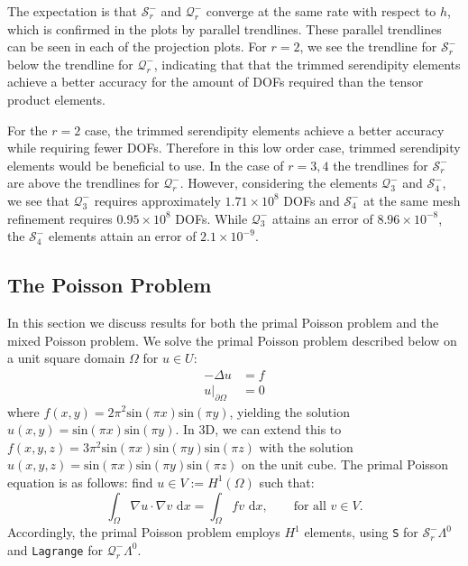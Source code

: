 \documentclass[format=acmsmall,screen,timestamp=false,a4paper]{acmart}
\begin{document}
The expectation is that $\mathcal{S}^-_r$ and $\mathcal{Q}^-_r$ converge at the same rate with respect to $h$, which is confirmed in the plots by parallel trendlines.  These parallel trendlines can be seen in each of the projection plots.  For $r=2$, we see the trendline for $\mathcal{S}^-_r$ below the trendline for $\mathcal{Q}^-_r$, indicating that that the trimmed serendipity elements achieve a better accuracy for the amount of DOFs required than the tensor product elements.  

For the $r=2$ case, the trimmed serendipity elements achieve a better accuracy while requiring fewer DOFs.  Therefore in this low order case, trimmed serendipity elements would be beneficial to use.  In the case of $r=3,4$ the trendlines for $\mathcal{S}^-_r$ are above the trendlines for $\mathcal{Q}^-_r$.  However, considering the elements $\mathcal{Q}^-_3$ and $\mathcal{S}^-_4$, we see that $\mathcal{Q}^-_3$ requires approximately $1.71 \times 10^8$ DOFs and $\mathcal{S}^-_4$ at the same mesh refinement requires $0.95 \times 10^8$ DOFs.  While $\mathcal{Q}^-_3$ attains an error of $8.96 \times 10^{-8}$, the $\mathcal{S}^-_4$ elements attain an error of $2.1 \times 10^{-9}$.  
 



\subsection{The Poisson Problem}
In this section we discuss results for both the primal Poisson problem and the mixed Poisson problem.  We solve the primal Poisson problem described below on a unit square domain $\Omega$ for $u \in U$:
\begin{align*}
    -\Delta u &= f \\
    \displaystyle u\vert_{\partial \Omega} &= 0
\end{align*}
where $f(x,y) = 2\pi^2\text{sin}(\pi x)\text{sin}(\pi y) $, yielding the solution $u(x,y) = \text{sin}(\pi x)\text{sin}(\pi y)$. In 3D, we can extend this to $f(x,y,z) = 3\pi^2\text{sin}(\pi x)\text{sin}(\pi y)\text{sin}(\pi z)$ with the solution $u(x,y,z) = \text{sin}(\pi x)\text{sin}(\pi y)\text{sin}(\pi z)$ on the unit cube.  The primal Poisson equation is as follows: find $u \in V:= H^1(\Omega)$ such that:
\begin{equation*}
    \int_\Omega \nabla u \cdot \nabla v \text{ d}x = \int_\Omega f v \text{ d}x,\qquad \text{for all $v \in V$}.
\end{equation*}
Accordingly, the primal Poisson problem employs $H^1$ elements, using \texttt{S} for $\mathcal{S}^-_r \Lambda^0$ and \texttt{Lagrange} for $\mathcal{Q}^-_r \Lambda^0$. 
\end{document}
